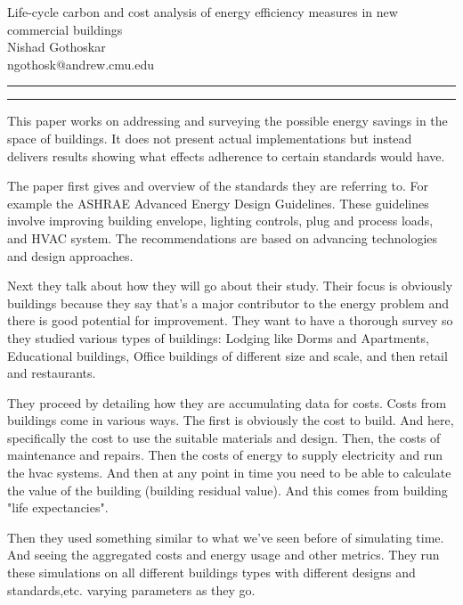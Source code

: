 \documentclass[11pt]{article}
\newcommand{\question}[2] {\vspace{.25in} \hrule\vspace{0.5em}
	\noindent{\bf #1: #2} \vspace{0.5em}
	\hrule \vspace{.10in}}
\newcommand{\myname}{Nishad Gothoskar}
\newcommand{\myandrew}{ngothosk}
\begin{document}
	
	\medskip                        %
	
	\thispagestyle{plain}
	\begin{center}                  %
		{\Large Life-cycle carbon and cost analysis of energy efficiency measures in new commercial buildings
} \\
		\myname \\
		\myandrew @andrew.cmu.edu\\
	\end{center}
	
	\question{1}{Summary}
	\quad This paper works on addressing and surveying the possible energy savings in the space of buildings. It does not present actual implementations but instead delivers results showing what effects adherence to certain standards would have.
	
	\quad The paper first gives and overview of the standards they are referring to. For example the ASHRAE Advanced Energy Design Guidelines. These guidelines involve improving building envelope, lighting controls, plug and process loads, and HVAC system. The recommendations are based on advancing technologies and design approaches.
	
	\quad Next they talk about how they will go about their study. Their focus is obviously buildings because they say that's a major contributor to the energy problem and there is good potential for improvement. They want to have a thorough survey so they studied various types of buildings: Lodging like Dorms and Apartments, Educational buildings, Office buildings of different size and scale, and then retail and restaurants.
	
	\quad They proceed by detailing how they are accumulating data for costs. Costs from buildings come in various ways. The first is obviously the cost to build. And here, specifically the cost to use the suitable materials and design. Then, the costs of maintenance and repairs. Then the costs of energy to supply electricity and run the hvac systems. And then at any point in time you need to be able to calculate the value of the building (building residual value). And this comes from building "life expectancies".
	
	\quad Then they used something similar to what we've seen before of simulating time. And  seeing the aggregated costs and energy usage and other metrics. They run these simulations on all different buildings types with different designs and standards,etc. varying parameters as they go.
	
\end{document}
